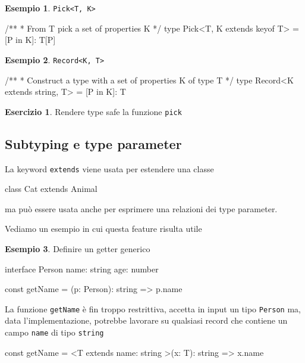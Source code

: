 \documentclass[12pt]{article}
\theoremstyle{definition}
\newtheorem{example}{Esempio}[subsection]
\newtheorem{exercise}{Esercizio}[subsection]
\newenvironment{code}
  {\vspace{0.5cm} \VerbatimEnvironment\begin{typescriptcode}}
  {\end{typescriptcode} \vspace{0.2cm}}
\begin{document}
\begin{example}
\texttt{Pick<T, K>}

\begin{code}
/**
* From T pick a set of properties K
*/
type Pick<T, K extends keyof T> = { [P in K]: T[P] }
\end{code}
\end{example}

\begin{example}
\texttt{Record<K, T>}

\begin{code}
/**
 * Construct a type with a set of properties K of type T
 */
type Record<K extends string, T> = { [P in K]: T }
\end{code}
\end{example}

\begin{exercise}
Rendere type safe la funzione \texttt{pick}
\end{exercise}

\subsection{Subtyping e type parameter}

La keyword \texttt{extends} viene usata per estendere una classe

\begin{code}
class Cat extends Animal {}
\end{code}

ma può essere usata anche per esprimere una relazioni dei type parameter.

Vediamo un esempio in cui questa feature risulta utile

\begin{example}
Definire un getter generico

\begin{code}
interface Person {
  name: string
  age: number
}

const getName = (p: Person): string => p.name
\end{code}

La funzione \texttt{getName} è fin troppo restrittiva, accetta in input un tipo \texttt{Person} ma, data l'implementazione,
potrebbe lavorare su qualsiasi record che contiene un campo \texttt{name} di tipo \texttt{string}

\begin{code}
const getName = <T extends { name: string }>(x: T): string =>
  x.name
\end{code}
\end{example}
\end{document}
